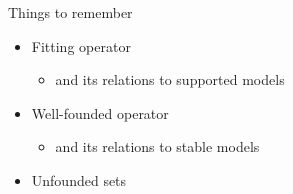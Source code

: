 \begin{frame}{Things to remember}
  \medskip
  \begin{itemize}
  \item Fitting operator
    \begin{itemize}
    \item and its relations to supported models
    \end{itemize}
  \item Well-founded operator
    \begin{itemize}
    \item and its relations to stable models
    \end{itemize}
  \item Unfounded sets
  \end{itemize}
\end{frame}
%
